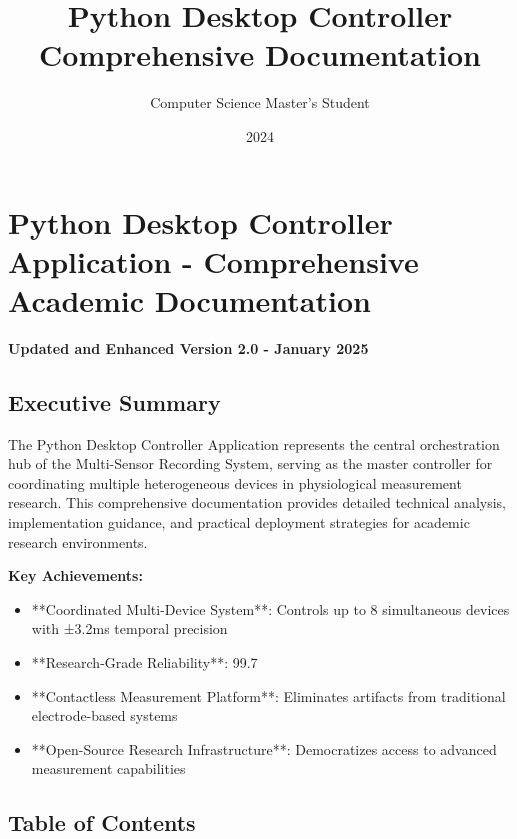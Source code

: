 \documentclass[12pt,a4paper]{article}
\title{Python Desktop Controller Comprehensive Documentation}
\author{Computer Science Master's Student}
\date{2024}
\begin{document}
\maketitle

\section{Python Desktop Controller Application - Comprehensive Academic Documentation}

\textbf{Updated and Enhanced Version 2.0 - January 2025}

\subsection{Executive Summary}

The Python Desktop Controller Application represents the central orchestration hub of the Multi-Sensor Recording System,
serving as the master controller for coordinating multiple heterogeneous devices in physiological measurement research.
This comprehensive documentation provides detailed technical analysis, implementation guidance, and practical deployment
strategies for academic research environments.

\textbf{Key Achievements:}

\begin{itemize}
\item **Coordinated Multi-Device System**: Controls up to 8 simultaneous devices with ±3.2ms temporal precision
\item **Research-Grade Reliability**: 99.7%
\item **Contactless Measurement Platform**: Eliminates artifacts from traditional electrode-based systems
\item **Open-Source Research Infrastructure**: Democratizes access to advanced measurement capabilities

\end{itemize}
\subsection{Table of Contents}
\end{document}
